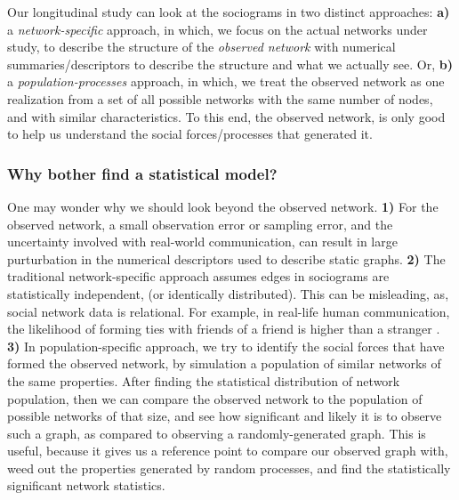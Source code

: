 \documentclass{acm_proc_article-sp}
\begin{document}
Our longitudinal study can look at the sociograms in two distinct approaches: \textbf{a)} a \textit{network-specific} approach, in which, we focus on the actual networks under study, to describe the structure of the \textit{observed network} with numerical summaries/descriptors to describe the structure and what we actually see. Or, \textbf{b)} a \textit{population-processes} approach, in which, we treat the observed network as one realization from a set of all possible networks with the same number of nodes, and with similar characteristics. To this end, the observed network, is only good to help us understand the social forces/processes that generated it. 

\subsubsection{Why bother find a statistical model?}

One may wonder why we should look beyond the observed network. \textbf{1)} For the observed network, a small observation error or sampling error, and the uncertainty involved with real-world communication, can result in large purturbation in the numerical descriptors used to describe static graphs. \textbf{2)} The traditional network-specific approach assumes edges in sociograms are statistically independent, (or identically distributed). This can be misleading, as, social network data is relational. For example, in real-life human communication, the likelihood of forming ties with friends of a friend is higher than a stranger \cite{Heider}. \textbf{3)} In population-specific approach, we try to identify the social forces that have formed the observed network, by simulation a population of similar networks of the same properties. After finding the statistical distribution of network population, then we can compare the observed network to the population of possible networks of that size, and see how significant and likely it is to observe such a graph, as compared to observing a randomly-generated graph. This is useful, because it gives us a reference point to compare our observed graph with, weed out the properties generated by random processes, and find the statistically significant network statistics. 
\end{document}
